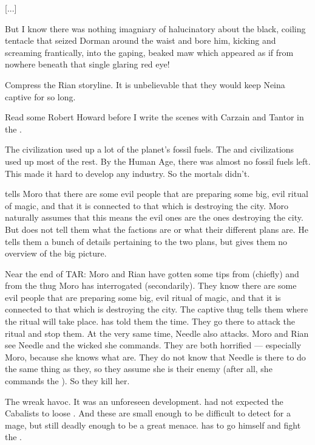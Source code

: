   [...]
  
  But I know there was nothing imagniary of halucinatory about the black, coiling tentacle that seized Dorman around the waist and bore him, kicking and screaming frantically, into the gaping, beaked maw which appeared as if from nowhere beneath that single glaring red eye!


Compress the Rian storyline. 
It is unbelievable that they would keep Neina captive for so long. 


Read some Robert Howard before I write the scenes with Carzain and Tantor in the \wylde. 


The \ophidian civilization used up a lot of the planet's fossil fuels. 
The \quiljaaran and \aryoth civilizations used up most of the rest.
By the Human Age, there was almost no fossil fuels left.
This made it hard to develop any industry. 
So the mortals didn't. 

\Nasshikerr tells Moro that there are some evil people that are preparing some big, evil ritual of magic, and that it is connected to that which is destroying the city.
Moro naturally assumes that this means the evil ones are the ones destroying the city.
But \Nasshikerr does not tell them what the factions are or what their different plans are.
He tells them a bunch of details pertaining to the two plans, but gives them no overview of the big picture. 

Near the end of TAR:
  Moro and Rian have gotten some tips from \Nasshikerr (chiefly) and from the thug Moro has interrogated (secondarily).
  They know there are some evil people that are preparing some big, evil ritual of magic, and that it is connected to that which is destroying the city.
  The captive thug tells them where the ritual will take place. 
  \Nasshikerr has told them the time. 
  They go there to attack the ritual and stop them.
  At the very same time, Needle also attacks.
  Moro and Rian see Needle and the wicked \banes she commands. 
  They are both horrified --- especially Moro, because she knows what \banes are. 
  They do not know that Needle is there to do the same thing as they, so they assume she is their enemy (after all, she commands the \banes).
  So they kill her. 
  
  The \banes wreak havoc. 
  It was an unforeseen development.
  \Psyrex had not expected the Cabalists to loose \banes. 
  And these \lesserbanes are small enough to be difficult to detect for a mage, but still deadly enough to be a great menace. 
  \Psyrex has to go himself and fight the \banes. 
  
